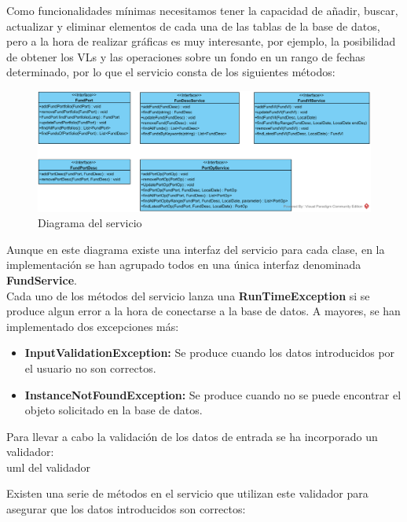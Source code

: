 \documentclass[12pt, a4paper]{article}
\begin{document}
Como funcionalidades mínimas necesitamos tener la capacidad de añadir, buscar, actualizar y eliminar elementos de cada una de las tablas de la base de datos, pero a la hora de realizar gráficas es muy interesante, por ejemplo, la posibilidad de obtener los \gls{VL}s y las operaciones sobre un fondo en un rango de fechas determinado, por lo que el servicio consta de los siguientes métodos:\\

\begin{figure}[htbp]
	\centering
	\includegraphics[width=\textwidth]{figuras/Diagrama_Modelo.png}
	\caption{Diagrama del servicio}
	\label{fig:relacional}
	\end {figure}

Aunque en este diagrama existe una interfaz del servicio para cada clase, en la implementación se han agrupado todos en una única interfaz denominada \textbf{FundService}.\\

Cada uno de los métodos del servicio lanza una \textbf{RunTimeException} si se produce algun error a la hora de conectarse a la base de datos. A mayores, se han implementado dos excepciones más:

\begin{itemize}
	\item \textbf{InputValidationException:} Se produce cuando los datos introducidos por el usuario no son correctos.
	\item \textbf{InstanceNotFoundException:} Se produce cuando no se puede encontrar el objeto solicitado en la base de datos.
\end{itemize}


Para llevar a cabo la validación de los datos de entrada se ha incorporado un validador: \\

uml del validador\\

\newpage

Existen una serie de métodos en el servicio que utilizan este validador para asegurar que los datos introducidos son correctos:
\end{document}
